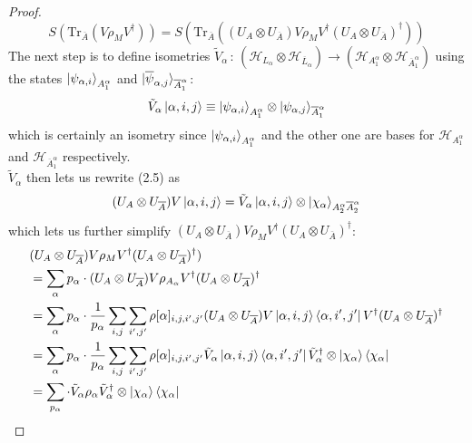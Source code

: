 \documentclass[12pt,a4paper]{article}
\numberwithin{equation}{section}
\newcommand{\ketbra}[2]{\ket{#1}\bra{#2}}
\newcommand{\ketbras}[1]{\ketbra{#1}{#1}}
\newcommand{\ol}[1]{\overline{#1}}
\theoremstyle{definition}
\theoremstyle{theorem}
\theoremstyle{example}
\begin{document}
\begin{itemize}
\begin{proof}
			\begin{equation}
				S(\text{Tr}_{\ol{A}}(V\rho_{M} V^{\dagger}))=S(\text{Tr}_{\ol{A}}((U_{A}\otimes U_{\ol{A}})V\rho_{M} V^{\dagger}(U_{A}\otimes U_{\ol{A}})^{\dagger}))
			\end{equation}
			The next step is to define isometries $\tilde{V}_{\alpha}\,:\,(\mathcal{H}_{L_{\alpha}}\otimes\mathcal{H}_{\ol{L}_{\alpha}})\to(\mathcal{H}_{A_{1}^{\alpha}}\otimes\mathcal{H}_{\ol{A}_{1}^{\alpha}})$ using the states $\ket{\psi_{\alpha,i}}_{A_{1}^{\alpha}}$ and $\ket{\ol{\psi}_{\alpha,j}}_{\ol{A}_{1}^{\alpha}}$:
			\begin{equation}
				\tilde{V}_{\alpha}\ket{\alpha,i,j}\equiv\ket{\psi_{\alpha,i}}_{A_{1}^{\alpha}}\otimes\ket{\psi_{\alpha,j}}_{\ol{A}_{1}^{\alpha}}
			\end{equation}
			which is certainly an isometry since $\ket{\psi_{\alpha,i}}_{A_{1}^{\alpha}}$ and the other one are bases for $\mathcal{H}_{A_{1}^{\alpha}}$ and $\mathcal{H}_{\ol{A}_{1}^{\alpha}}$ respectively.\\
			$\tilde{V}_{\alpha}$ then lets us rewrite (2.5) as
			\begin{equation}
				(U_{A}\otimes U_{\ol{A}})V\ket{\alpha,i,j}=\tilde{V}_{\alpha}\ket{\alpha,i,j}\otimes\ket{\chi_{\alpha}}_{A_{2}^{\alpha}\ol{A}_{2}^{\alpha}}
			\end{equation}
			which lets us further simplify $(U_{A}\otimes U_{\ol{A}})V\rho_{M} V^{\dagger}(U_{A}\otimes U_{\ol{A}})^{\dagger}$:
			\begin{equation}
				\begin{aligned}
					&(U_{A}\otimes U_{\ol{A}})V\rho_{M} V^{\dagger}(U_{A}\otimes U_{\ol{A}})^{\dagger})\\&=\sum_{\alpha}p_{\alpha}\cdot (U_{A}\otimes U_{\ol{A}})V\rho_{A_{\alpha}} V^{\dagger}(U_{A}\otimes U_{\ol{A}})^{\dagger}\\&=\sum_{\alpha}p_{\alpha}\cdot \frac{1}{p_{\alpha}}\sum_{i,j}\sum_{i',j'}\rho[\alpha]_{i,j,i',j'}(U_{A}\otimes U_{\ol{A}})V\ketbra{\alpha,i,j}{\alpha,i',j'} V^{\dagger}(U_{A}\otimes U_{\ol{A}})^{\dagger}\\&=\sum_{\alpha}p_{\alpha}\cdot\frac{1}{p_{\alpha}}\sum_{i,j}\sum_{i',j'}\rho[\alpha]_{i,j,i',j'}\tilde{V}_{\alpha}\ketbra{\alpha,i,j}{\alpha,i',j'}\tilde{V}_{\alpha}^{\dagger}\otimes\ketbras{\chi_{\alpha}}\\&=\sum_{p_{\alpha}}\cdot\tilde{V}_{\alpha}\rho_{\alpha}\tilde{V}_{\alpha}^{\dagger}\otimes\ketbras{\chi_{\alpha}}
				\end{aligned}
			\end{equation}

\end{proof}
\end{itemize}
\end{document}
